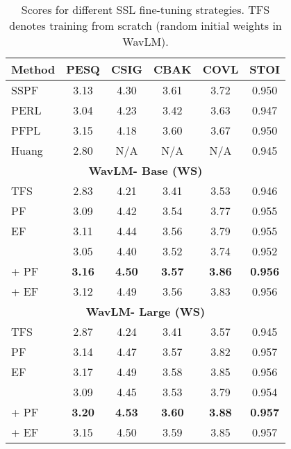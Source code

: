 \documentclass[a4paper]{article}
\begin{document}
\begin{table}[th]
  \caption{Scores for different SSL fine-tuning strategies. TFS denotes training from scratch (random initial weights in WavLM).}
  \label{table:2}
  \centering
  \begin{tabular}{l@{}ccccc}
    \toprule
    \multicolumn{1}{c}{\textbf{Method}} & \multicolumn{1}{c}{\textbf{PESQ}} & \multicolumn{1}{c}{\textbf{CSIG}} & \multicolumn{1}{c}{\textbf{CBAK}} & \multicolumn{1}{c}{\textbf{COVL}} & \multicolumn{1}{c}{\textbf{STOI}} \\
    \midrule
    SSPF~\cite{qiu2021self}                  & 3.13   & 4.30   & 3.61  & 3.72    & 0.950 \\
    PERL~\cite{kataria2021perceptual}  & 3.04   & 4.23   & 3.42   & 3.63   & 0.947 \\
    PFPL~\cite{hsieh2020improving}           & 3.15   & 4.18   & 3.60   & 3.67   & 0.950 \\
    Huang~\cite{ZiliSSL}                          & 2.80   & N/A      & N/A      & N/A      & 0.945 \\
    \midrule
\multicolumn{6}{c}{\textbf{WavLM- Base (WS)}}\\
    \cmidrule(r){1-6}
    TFS     & 2.83   &4.21  & 3.41   &3.53  & 0.946 \\
    PF  & 3.09   & 4.42   & 3.54   & 3.77   & 0.955 \\
    EF  & 3.11   & 4.44   & 3.56   & 3.79   & 0.955 \\
        & 3.05   & 4.40   & 3.52  & 3.74    & 0.952 \\
     + PF   & \textbf{3.16}  & \textbf{4.50}  & \textbf{3.57}   & \textbf{3.86}   & \textbf{0.956} \\
     + EF   & 3.12  & 4.49  & 3.56   & 3.83   & 0.956 \\
    


    \cmidrule(r){1-6}
    \multicolumn{6}{c}{\textbf{WavLM- Large (WS)}}\\
    \cmidrule(r){1-6}
    TFS     & 2.87   &4.24  & 3.41   &3.57  & 0.945 \\
    PF  & 3.14 & 4.47 & 3.57 & 3.82 & 0.957 \\
    EF  & 3.17 & 4.49 & 3.58 & 3.85 & 0.956 \\
      & 3.09 & 4.45 & 3.53 & 3.79 & 0.954 \\
     + PF   & \textbf{3.20} & \textbf{4.53} & \textbf{3.60} & \textbf{3.88} & \textbf{0.957} \\
     + EF  & 3.15 & 4.50 & 3.59 & 3.85 & 0.957 \\
    

    \bottomrule
  \end{tabular}
\end{table}
\end{document}

